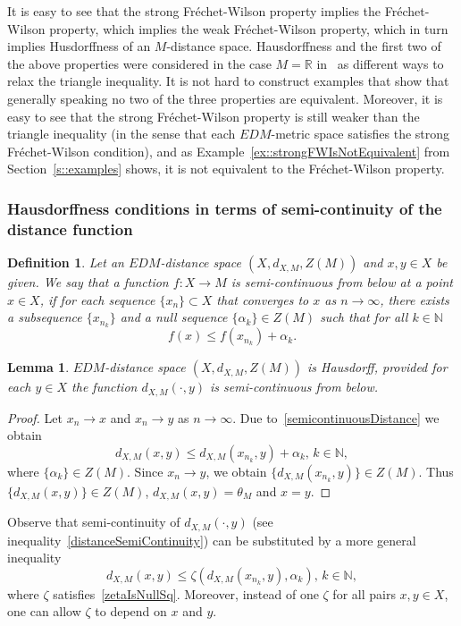 \documentclass[12pt]{amsart}          %
\newtheorem{lemma}{Lemma}
\newtheorem{definition}{Definition}
\newcommand{\RR}{\mathbb R}
\newcommand{\NN}{\mathbb N}
\begin{document}
It is easy to see that the strong Fr\'{e}chet-Wilson property implies the Fr\'{e}chet-Wilson property, which implies the weak Fr\'{e}chet-Wilson property, which in turn implies Husdorffness of an $M$-distance space. Hausdorffness and the first two of the above properties were considered {in the case $M= \RR$ }in~\cite{Wilson} as different ways to relax the triangle inequality. It is not hard to construct examples that show that generally speaking no two of the three properties are equivalent. Moreover, it is easy to see that the strong Fr\'{e}chet-Wilson property is still weaker than the triangle inequality (in the sense that each $EDM$-metric space satisfies the strong Fr\'{e}chet-Wilson condition), and as Example~\ref{ex::strongFWIsNotEquivalent} from Section~\ref{s::examples} shows, it is not equivalent to  the Fr\'{e}chet-Wilson property.


\subsubsection{Hausdorffness conditions in terms of semi-continuity of the distance function}
\begin{definition}
Let an $EDM$-distance space $(X,d_{X,M}, Z(M))$ and $x,y\in X$ be given. We say that a  function $f\colon X\to M$ is semi-continuous from below at a point $x\in X$, if for each sequence $\{ x_n\}\subset X$ that converges to $x$ as $n\to\infty$, there exists a subsequence $\{ x_{n_k}\}$ and a null sequence $\{\alpha_k\}\in Z(M)$ such that for all $k\in\NN$
\begin{equation}\label{semicontinuousDistance}
  f(x)\le f(x_{n_k})+\alpha_k.
\end{equation}
\end{definition}
\begin{lemma}
$EDM$-distance space $(X,d_{X,M}, Z(M))$ is Hausdorff, provided for each $y\in X$ the function  $d_{X,M}(\cdot,y)$ is semi-continuous from below.
\end{lemma}
\begin{proof}
Let $x_n\to x$ and $x_n\to y$ as $n\to\infty$. Due to~\eqref{semicontinuousDistance} we obtain 
\begin{equation}\label{distanceSemiContinuity}
  d_{X,M}(x,y)\le d_{X,M}(x_{n_k},y)+\alpha_k,\,k\in\NN,
\end{equation}
  where $\{\alpha_k\}\in Z(M)$. 
Since $x_n\to y$, we obtain $\{ d_{X,M}(x_{n_k},y)\}\in Z(M)$. Thus $\{ d_{X,M}(x,y)\}\in Z(M)$,  $d_{X,M}(x,y)=\theta_M$ and $x=y$.
\end{proof}
Observe that semi-continuity of $d_{X,M}(\cdot ,y)$ (see inequality~\eqref{distanceSemiContinuity}) can be substituted by a more general inequality
\begin{equation}\label{zetaSemicontinuousDistance}
 d_{X,M}(x,y)\le\zeta( d_{X,M}(x_{n_k},y),\alpha_k),\,k\in\NN,
\end{equation}
where $\zeta$ satisfies~\eqref{zetaIsNullSq}. Moreover, instead of one $\zeta$ for all pairs $x,y\in X$, one can allow  $\zeta $ to depend on $x$ and $y$. 
\end{document}
